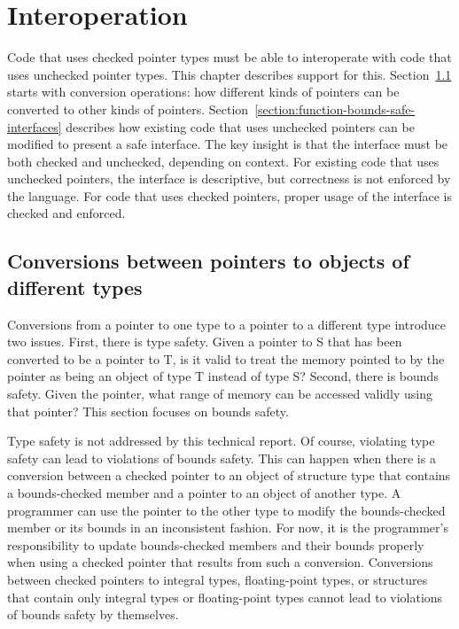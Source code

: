 
\newcommand{\dynamicboundscast}{\lstinline|dynamic_bounds_cast|}
\newcommand{\dynamicboundscastinst}[2]{\lstinline|dynamic_bounds_cast<|#1\lstinline|>|#2}
\newcommand{\assumeboundscast}{\lstinline|assume_bounds_cast|}
\newcommand{\assumeboundscastinst}[2]{\lstinline|assume_bounds_cast<|#1\lstinline|>|#2}

\chapter{Interoperation}
\label{chapter:interoperation}

Code that uses checked pointer types must be able to interoperate with
code that uses unchecked pointer types.  This chapter describes support
for this.  Section~\ref{section:pointer-casting} starts with
conversion operations: how different kinds of pointers can
be converted to other kinds of pointers.  
Section~\ref{section:function-bounds-safe-interfaces}
describes how existing code that uses unchecked pointers can be modified
to present a safe interface.  The key insight is that
the interface must be both checked and unchecked, depending on context.
For existing code that uses unchecked pointers, the interface is descriptive,
but correctness is not enforced by the language.  For code that uses checked
pointers, proper usage of the interface is checked and enforced.

\section{Conversions between pointers to objects of different types}
\label{section:pointer-casting}

Conversions from a pointer to one type to a pointer to a different type
introduce two issues. First, there is type safety. Given a pointer to S
that has been converted to be a pointer to T, is it valid to treat the
memory pointed to by the pointer as being an object of type T instead of
type S? Second, there is bounds safety. Given the pointer, what range of
memory can be accessed validly using that pointer? This section focuses on
bounds safety.

Type safety is not addressed by this technical report. Of course, violating
type safety can lead to violations of bounds safety. This can happen
when there is a conversion between a checked pointer to an object of
structure type that contains a bounds-checked member and a pointer
to an object of another type. A programmer can use the pointer to the
other type to modify the bounds-checked member or its bounds in an
inconsistent fashion. For now, it is the programmer's responsibility to
update bounds-checked members and their bounds properly when using a
checked pointer that results from such a conversion. Conversions between
checked pointers to integral types, floating-point types, or structures that
contain only integral types or floating-point types cannot lead to
violations of bounds safety by themselves.


